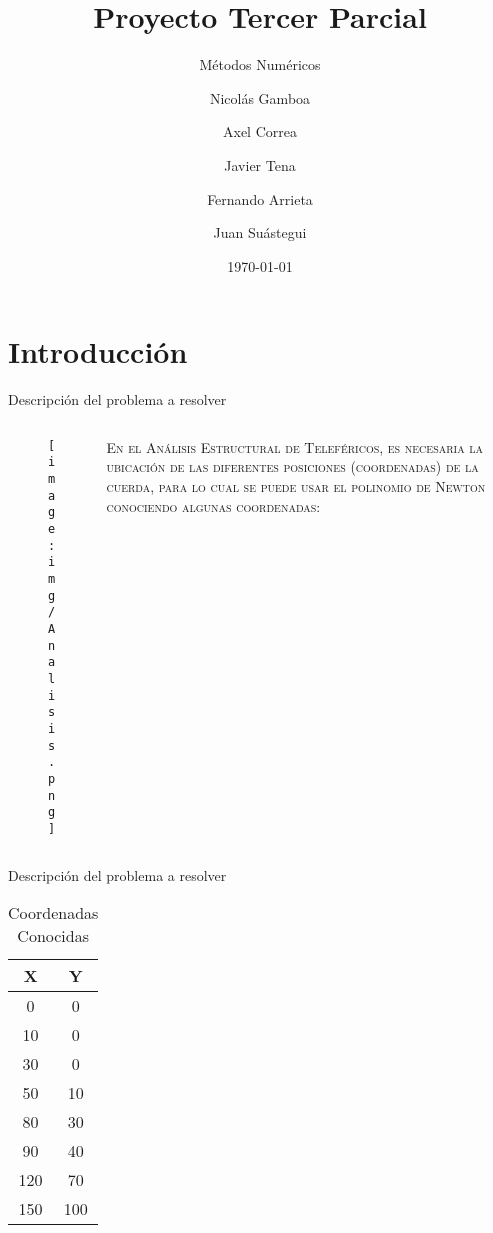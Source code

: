 \documentclass{cubeamer}
\title{Proyecto Tercer Parcial}
\subtitle{Métodos Numéricos}
\author[Equipo 4]{Nicolás Gamboa \and Axel Correa \and Javier Tena \and Fernando Arrieta \and Juan Suástegui}
\date{\today} %
\institute[Instituto Tecnológico y de Estudios Superiores de Monterrey]{Instituto Tecnológico y de Estudios Superiores de Monterrey}
\begin{document}
\maketitle

\cutoc

\section{Introducción}

\begin{frame}{Descripción del problema a resolver}
    \begin{columns}
        \begin{column}{0.3\textwidth}
            \begin{figure}
                \centering
                \texttt{[image: img/Analisis.png]}
            \end{figure}
        \end{column}
        \begin{column}{0.7\textwidth}
        \textsc{En el Análisis Estructural de Teleféricos, es necesaria la ubicación de las diferentes posiciones (coordenadas) de la cuerda, para lo cual se puede usar el polinomio de Newton conociendo algunas coordenadas:}
        \end{column}
    \end{columns}
\end{frame}

\begin{frame}{Descripción del problema a resolver}
    \begin{table}[t]
    \begin{center}
    \begin{tabular}{| c | c |}
    \hline
          X & Y \\ \hline
         0 & 0 \\
         10 & 0 \\
         30 & 0 \\
         50 & 10 \\
         80 & 30 \\
         90 & 40 \\
         120 & 70 \\
         150 & 100 \\ \hline
    \end{tabular}
    \caption{Coordenadas Conocidas}
    \end{center}
    \end{table}
\end{frame}
\end{document}
